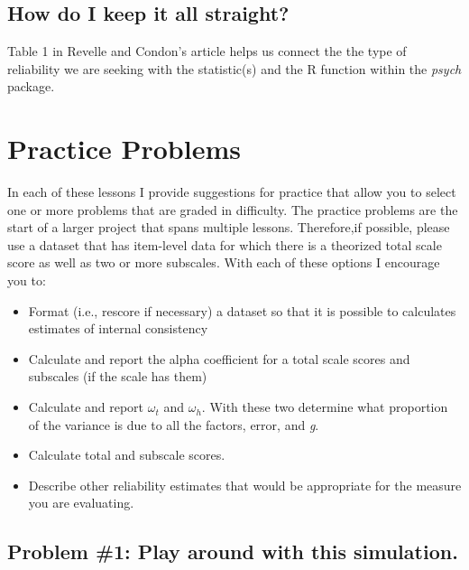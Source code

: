 \documentclass[
  english,
]{book}
\providecommand{\tightlist}{%
  \setlength{\itemsep}{0pt}\setlength{\parskip}{0pt}}
\begin{document}
\hypertarget{how-do-i-keep-it-all-straight}{%
\subsection{How do I keep it all straight?}\label{how-do-i-keep-it-all-straight}}

Table 1 in Revelle and Condon's \citep{revelle_reliability_2019} article helps us connect the the type of reliability we are seeking with the statistic(s) and the R function within the \emph{psych} package.

\hypertarget{practice-problems-2}{%
\section{Practice Problems}\label{practice-problems-2}}

In each of these lessons I provide suggestions for practice that allow you to select one or more problems that are graded in difficulty. The practice problems are the start of a larger project that spans multiple lessons. Therefore,if possible, please use a dataset that has item-level data for which there is a theorized total scale score as well as two or more subscales. With each of these options I encourage you to:

\begin{itemize}
\tightlist
\item
  Format (i.e., rescore if necessary) a dataset so that it is possible to calculates estimates of internal consistency
\item
  Calculate and report the alpha coefficient for a total scale scores and subscales (if the scale has them)
\item
  Calculate and report \(\omega_{t}\) and \(\omega_{h}\). With these two determine what proportion of the variance is due to all the factors, error, and \emph{g}.
\item
  Calculate total and subscale scores.
\item
  Describe other reliability estimates that would be appropriate for the measure you are evaluating.
\end{itemize}

\hypertarget{problem-1-play-around-with-this-simulation.}{%
\subsection{Problem \#1: Play around with this simulation.}\label{problem-1-play-around-with-this-simulation.}}
\end{document}
